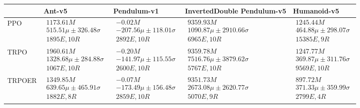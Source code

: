\begin{tabular}{|l|p{3.2cm}|p{3.2cm}|p{3.2cm}|p{3.2cm}|}
\toprule
 & Ant-v5 & Pendulum-v1 & InvertedDouble Pendulum-v5 & Humanoid-v5 \\
\midrule
PPO & $\begin{array}{c} 1173.61M \\ 515.51\mu \pm 326.48\sigma \\ 1895E, 10R \end{array}$ & $\begin{array}{c} -0.02M \\ -207.56\mu \pm 118.01\sigma \\ 2892E, 10R \end{array}$ & $\begin{array}{c} 9359.93M \\ 1090.87\mu \pm 2910.66\sigma \\ 6965E, 10R \end{array}$ & $\begin{array}{c} 1245.44M \\ 464.88\mu \pm 298.07\sigma \\ 15385E, 9R \end{array}$ \\  \hline
TRPO & $\begin{array}{c} 1960.61M \\ 1328.68\mu \pm 284.88\sigma \\ 1067E, 10R \end{array}$ & $\begin{array}{c} -0.20M \\ -141.97\mu \pm 115.55\sigma \\ 2600E, 10R \end{array}$ & $\begin{array}{c} 9359.78M \\ 7516.76\mu \pm 3879.62\sigma \\ 5767E, 10R \end{array}$ & $\begin{array}{c} 1247.77M \\ 369.87\mu \pm 311.76\sigma \\ 9569E, 10R \end{array}$ \\  \hline
TRPOER & $\begin{array}{c} 1349.85M \\ 639.65\mu \pm 465.91\sigma \\ 1882E, 8R \end{array}$ & $\begin{array}{c} -0.07M \\ -173.49\mu \pm 156.48\sigma \\ 2859E, 10R \end{array}$ & $\begin{array}{c} 9351.73M \\ 2673.08\mu \pm 2620.77\sigma \\ 5070E, 9R \end{array}$ & $\begin{array}{c} 897.72M \\ 371.33\mu \pm 359.99\sigma \\ 2799E, 4R \end{array}$ \\  \hline

\end{tabular}
